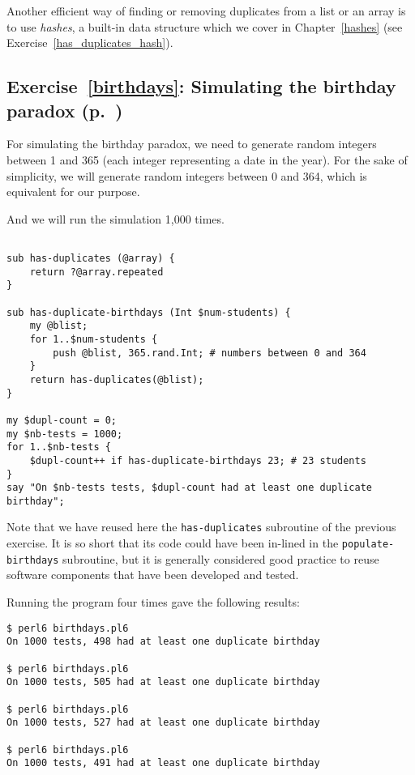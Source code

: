 Another efficient way of finding or removing duplicates 
from a list or an array is to use \emph{hashes}, a 
built-in data structure which we cover in 
Chapter~\ref{hashes} (see Exercise~\ref{has_duplicates_hash}).

\subsection{Exercise~\ref{birthdays}: Simulating the birthday paradox (p.~\pageref{birthdays})}
\label{sol_birthdays}

For simulating the birthday paradox, we need to generate 
random integers between 1 and 365 (each integer 
representing a date in the year). For the sake of 
simplicity, we will generate random integers between 
0 and 364, which is equivalent for our purpose.

And we will run the simulation 1,000 times.

\begin{verbatim}

sub has-duplicates (@array) {
    return ?@array.repeated
}

sub has-duplicate-birthdays (Int $num-students) {
    my @blist;
    for 1..$num-students {
        push @blist, 365.rand.Int; # numbers between 0 and 364
    }
    return has-duplicates(@blist);
}

my $dupl-count = 0;
my $nb-tests = 1000;
for 1..$nb-tests {
    $dupl-count++ if has-duplicate-birthdays 23; # 23 students
}
say "On $nb-tests tests, $dupl-count had at least one duplicate birthday";
\end{verbatim}

Note that we have reused here the {\tt has-duplicates} 
subroutine of the previous exercise. It is so short 
that its code could have been in-lined in the 
\verb'populate-birthdays'  
subroutine, but it is 
generally considered good practice to reuse software 
components that have been developed and tested.

Running the program four times gave the following 
results:

\begin{verbatim}
$ perl6 birthdays.pl6
On 1000 tests, 498 had at least one duplicate birthday

$ perl6 birthdays.pl6
On 1000 tests, 505 had at least one duplicate birthday

$ perl6 birthdays.pl6
On 1000 tests, 527 had at least one duplicate birthday

$ perl6 birthdays.pl6
On 1000 tests, 491 had at least one duplicate birthday
\end{verbatim}

